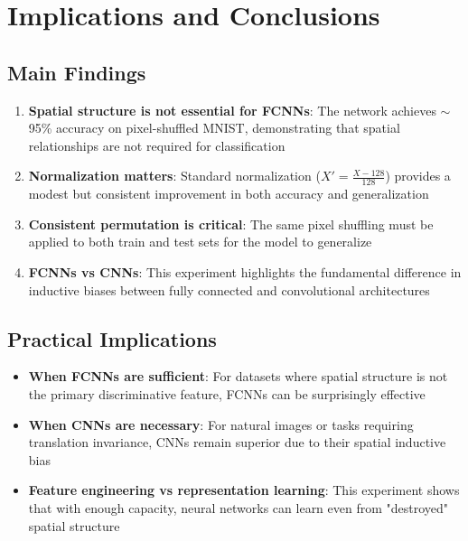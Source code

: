 \documentclass[11pt,a4paper]{article}
\begin{document}
\section{Implications and Conclusions}

\subsection{Main Findings}

\begin{enumerate}
    \item \textbf{Spatial structure is not essential for FCNNs}: The network achieves $\sim$95\% accuracy on pixel-shuffled MNIST, demonstrating that spatial relationships are not required for classification
    
    \item \textbf{Normalization matters}: Standard normalization ($X' = \frac{X-128}{128}$) provides a modest but consistent improvement in both accuracy and generalization
    
    \item \textbf{Consistent permutation is critical}: The same pixel shuffling must be applied to both train and test sets for the model to generalize
    
    \item \textbf{FCNNs vs CNNs}: This experiment highlights the fundamental difference in inductive biases between fully connected and convolutional architectures
\end{enumerate}

\subsection{Practical Implications}

\begin{itemize}
    \item \textbf{When FCNNs are sufficient}: For datasets where spatial structure is not the primary discriminative feature, FCNNs can be surprisingly effective
    
    \item \textbf{When CNNs are necessary}: For natural images or tasks requiring translation invariance, CNNs remain superior due to their spatial inductive bias
    
    \item \textbf{Feature engineering vs representation learning}: This experiment shows that with enough capacity, neural networks can learn even from "destroyed" spatial structure
\end{itemize}
\end{document}
